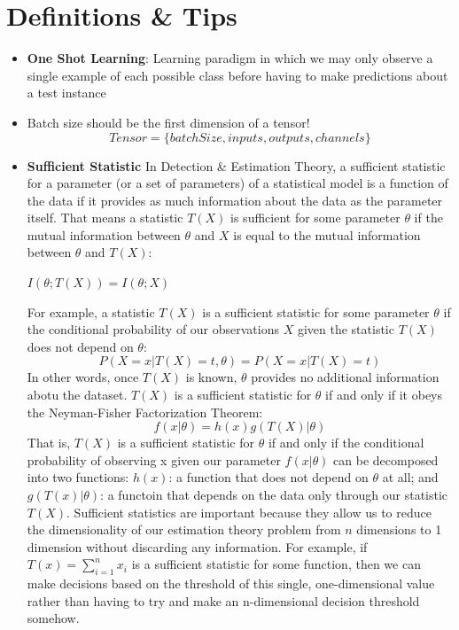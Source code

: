 \documentclass[12pt]{article}
\begin{document}
\section {Definitions \& Tips}
\begin{itemize}
\item \textbf{One Shot Learning}: Learning paradigm in which we may only observe a single example of each possible class before having to make predictions about a test instance 
\item Batch size should be the first dimension of a tensor! \[Tensor = \{batchSize, inputs, outputs, channels\}\]
\item \textbf{Sufficient Statistic} In Detection \& Estimation Theory, a sufficient statistic for a parameter (or a set of parameters) of a statistical model is a function of the data if it provides as much information about the data as the parameter itself. That means a statistic \(T(X)\) is sufficient for some parameter \(\theta\) if the mutual information between  \(\theta\) and \(X\) is equal to the mutual information between  \(\theta\) and \(T(X)\):

\(I(\theta; T(X)) = I(\theta; X)\)

For example, a statistic \(T(X)\) is a sufficient statistic for some parameter \(\theta\) if the conditional probability of our observations \(X\)  given the statistic \(T(X)\) does not depend on \(\theta\): 
\[P(X=x | T(X)=t, \theta) = P(X=x|T(X)=t)\]
In other words, once \(T(X)\) is known, \(\theta\) provides no additional information abotu the dataset. \(T(X)\) is a sufficient statistic for \(\theta\) if and only if it obeys the Neyman-Fisher Factorization Theorem: 
\[f(x|\theta) = h(x)g(T(X)|\theta)\]
That is, \(T(X)\) is a sufficient statistic for \(\theta\) if and only if the conditional probability of observing x given our parameter \(f(x|\theta)\) can be decomposed into two functions: \(h(x)\): a function that does not depend on \(\theta\) at all; and \(g(T(x)|\theta)\): a functoin that depends on the data only through our statistic \(T(X)\). Sufficient statistics are important because they allow us to reduce the dimensionality of our estimation theory problem from \(n\) dimensions to 1 dimension without discarding any information. For example, if \(T(x) = \sum_{i=1}^n x_i\) is a sufficient statistic for some function, then we can make decisions based on the threshold of this single, one-dimensional value rather than having to try and make an n-dimensional decision threshold somehow. 


\end{itemize}
\end{document}
